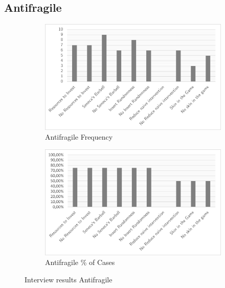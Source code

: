 \subsection{Antifragile}
\begin{figure}[H]
	\centering
	\begin{subfigure}[H]{0.5\textwidth}
		\centering
		\includegraphics[width=0.95\linewidth]{images/antifragile_frequency}
		\caption{Antifragile Frequency}
		\label{fig:antifragilefrequency}
	\end{subfigure}%
	\begin{subfigure}[H]{0.5\textwidth}
		\centering
		\includegraphics[width=0.95\linewidth]{images/antifragile_cases}
		\caption{Antifragile \% of Cases}
		\label{fig:antifragilecases}
	\end{subfigure}
	\caption{Interview results Antifragile}
	\label{fig:interviewresultsantifragile}
\end{figure}
